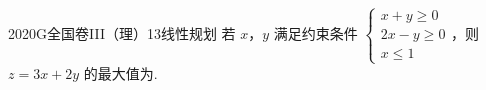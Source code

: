 
\begin{problem}{2020}{G}{全国卷III（理）}{13}{线性规划}
若 $ x $，$ y $ 满足约束条件 $ \begin{cases} x + y \geqslant 0 \\ 2x - y \geqslant 0 \\ x \leqslant 1 \end{cases} $，则 $ z = 3x + 2y $ 的最大值为\underline{\hspace{4em}}.
\end{problem}

\begin{answer}

\end{answer}

\begin{solutions}

\end{solutions}